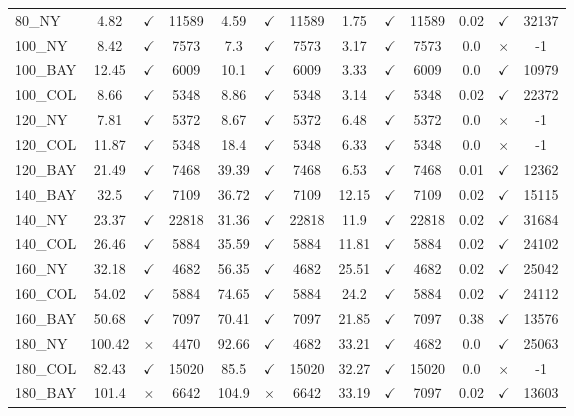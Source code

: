 \documentclass[main.tex]{subfiles}
\begin{document}
\begin{landscape}
\begin{center}
\begin{tabular}{lcccccccccccc}
80\_NY & 4.82 & $\checkmark$ & 11589 & 4.59 & $\checkmark$ & 11589 & 1.75 & $\checkmark$ & 11589 & 0.02 & $\checkmark$ & 32137\\
100\_NY & 8.42 & $\checkmark$ & 7573 & 7.3 & $\checkmark$ & 7573 & 3.17 & $\checkmark$ & 7573 & 0.0 & $\times$ & -1\\
100\_BAY & 12.45 & $\checkmark$ & 6009 & 10.1 & $\checkmark$ & 6009 & 3.33 & $\checkmark$ & 6009 & 0.0 & $\checkmark$ & 10979\\
100\_COL & 8.66 & $\checkmark$ & 5348 & 8.86 & $\checkmark$ & 5348 & 3.14 & $\checkmark$ & 5348 & 0.02 & $\checkmark$ & 22372\\
120\_NY & 7.81 & $\checkmark$ & 5372 & 8.67 & $\checkmark$ & 5372 & 6.48 & $\checkmark$ & 5372 & 0.0 & $\times$ & -1\\
120\_COL & 11.87 & $\checkmark$ & 5348 & 18.4 & $\checkmark$ & 5348 & 6.33 & $\checkmark$ & 5348 & 0.0 & $\times$ & -1\\
120\_BAY & 21.49 & $\checkmark$ & 7468 & 39.39 & $\checkmark$ & 7468 & 6.53 & $\checkmark$ & 7468 & 0.01 & $\checkmark$ & 12362\\
140\_BAY & 32.5 & $\checkmark$ & 7109 & 36.72 & $\checkmark$ & 7109 & 12.15 & $\checkmark$ & 7109 & 0.02 & $\checkmark$ & 15115\\
140\_NY & 23.37 & $\checkmark$ & 22818 & 31.36 & $\checkmark$ & 22818 & 11.9 & $\checkmark$ & 22818 & 0.02 & $\checkmark$ & 31684\\
140\_COL & 26.46 & $\checkmark$ & 5884 & 35.59 & $\checkmark$ & 5884 & 11.81 & $\checkmark$ & 5884 & 0.02 & $\checkmark$ & 24102\\
160\_NY & 32.18 & $\checkmark$ & 4682 & 56.35 & $\checkmark$ & 4682 & 25.51 & $\checkmark$ & 4682 & 0.02 & $\checkmark$ & 25042\\
160\_COL & 54.02 & $\checkmark$ & 5884 & 74.65 & $\checkmark$ & 5884 & 24.2 & $\checkmark$ & 5884 & 0.02 & $\checkmark$ & 24112\\
160\_BAY & 50.68 & $\checkmark$ & 7097 & 70.41 & $\checkmark$ & 7097 & 21.85 & $\checkmark$ & 7097 & 0.38 & $\checkmark$ & 13576\\
180\_NY & 100.42 & $\times$ & 4470 & 92.66 & $\checkmark$ & 4682 & 33.21 & $\checkmark$ & 4682 & 0.0 & $\checkmark$ & 25063\\
180\_COL & 82.43 & $\checkmark$ & 15020 & 85.5 & $\checkmark$ & 15020 & 32.27 & $\checkmark$ & 15020 & 0.0 & $\times$ & -1\\
180\_BAY & 101.4 & $\times$ & 6642 & 104.9 & $\times$ & 6642 & 33.19 & $\checkmark$ & 7097 & 0.02 & $\checkmark$ & 13603\\

\end{tabular}
\end{center}
\end{landscape}
\end{document}
